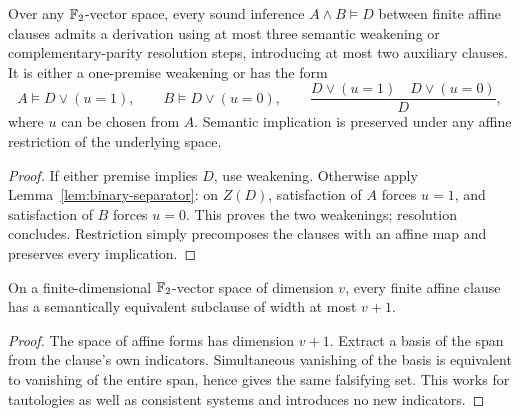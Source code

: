 \begin{lemma}\label{lem:affine-cover}
Over any \(\mathbb F_2\)-vector space, every sound inference \(A\wedge B\models D\)
between finite affine clauses admits a derivation using at most three
semantic weakening or complementary-parity resolution steps, introducing
at most two auxiliary clauses. It is either a one-premise weakening or
has the form
\[
 A\models D\vee(u=1),\qquad B\models D\vee(u=0),
 \qquad\frac{D\vee(u=1)\quad D\vee(u=0)}D,
\]
where \(u\) can be chosen from \(A\). Semantic implication is preserved
under any affine restriction of the underlying space.
\end{lemma}
\begin{proof}
If either premise implies \(D\), use weakening. Otherwise apply
Lemma~\ref{lem:binary-separator}: on \(Z(D)\), satisfaction of \(A\)
forces \(u=1\), and satisfaction of \(B\) forces \(u=0\).
This proves the two weakenings; resolution concludes. Restriction simply
precomposes the clauses with an affine map and preserves every implication.
\end{proof}

\begin{lemma}\label{lem:compression}
On a finite-dimensional \(\mathbb F_2\)-vector space of dimension \(v\), every
finite affine clause has a semantically equivalent subclause of width at
most \(v+1\).
\end{lemma}
\begin{proof}
The space of affine forms has dimension \(v+1\). Extract a basis of the
span from the clause's own indicators. Simultaneous vanishing of the basis
is equivalent to vanishing of the entire span, hence gives the same
falsifying set. This works for tautologies as well as consistent systems
and introduces no new indicators.
\end{proof}

